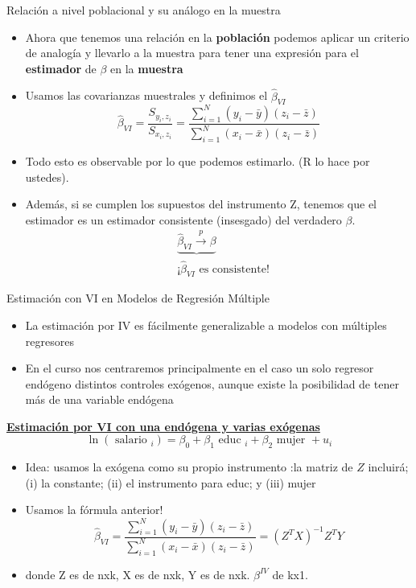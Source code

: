 \documentclass[10pt]{beamer}
\begin{document}
\begin{frame}{Relación a nivel poblacional y su análogo en la muestra}
    \begin{itemize}
        \item Ahora que tenemos una relación en la \textbf{población} podemos aplicar un criterio de analogía y llevarlo a la muestra para tener una expresión para el \textbf{estimador} de $\beta$ en la \textbf{muestra}
        \item Usamos las covarianzas muestrales y definimos el $\hat{\beta}_{V I}$
        $$
        \hat{\beta}_{V I}=\frac{S_{y_{i}, z_{i}}}{S_{x_{i}, z_{i}}}=\frac{\sum_{i=1}^{N}\left(y_{i}-\bar{y}\right)\left(z_{i}-\bar{z}\right)}{\sum_{i=1}^{N}\left(x_{i}-\bar{x}\right)\left(z_{i}-\bar{z}\right)}
        $$
        \item Todo esto es observable por lo que podemos estimarlo. (R lo hace por ustedes).
        \item Además, si se cumplen los supuestos del instrumento Z, tenemos que el estimador es un estimador consistente (insesgado) del verdadero $\beta$.
        \begin{align*}
            &\underbrace{\hat{\beta}_{V I} \xrightarrow{p} \beta}\\
            &\text{¡}\hat{\beta}_{V I} \text{ es consistente!}
        \end{align*}
        
    \end{itemize}
\end{frame}

\begin{frame}{Estimación con VI en Modelos de Regresión Múltiple}
    \begin{itemize}
        \item La estimación por IV es fácilmente generalizable a modelos con múltiples regresores
        \item En el curso nos centraremos principalmente en el caso un solo regresor endógeno distintos controles exógenos, aunque existe la posibilidad de tener más de una variable endógena
    \end{itemize}

    \underline{\textbf{Estimación por VI con una endógena y varias exógenas}}
    $$
    \ln \left(\text { salario }_{i}\right)=\beta_{0}+\beta_{1} \text { educ }_{i}+\beta_{2} \text { mujer }+u_{i}
    $$
    \begin{itemize}
        \item Idea: usamos la exógena como su propio instrumento :la matriz de $Z$ incluirá; (i) la constante; (ii) el instrumento para educ; y (iii) mujer
        \item Usamos la fórmula anterior!
        $$
        \hat{\beta}_{V I}=\frac{\sum_{i=1}^{N}\left(y_{i}-\bar{y}\right)\left(z_{i}-\bar{z}\right)}{\sum_{i=1}^{N}\left(x_{i}-\bar{x}\right)\left(z_{i}-\bar{z}\right)}=\left(Z^{T} X\right)^{-1} Z^{T} Y
        $$
        \item donde Z es de nxk, X es de nxk, Y es de nxk. $\beta^{IV}$ de kx1.
    \end{itemize}    
\end{frame}
\end{document}
